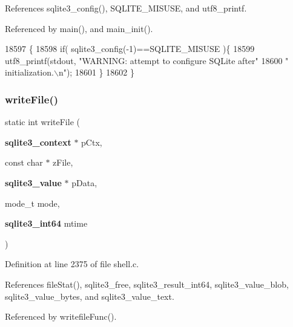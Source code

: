 References sqlite3\+\_\+config(), S\+Q\+L\+I\+T\+E\+\_\+\+M\+I\+S\+U\+SE, and utf8\+\_\+printf.



Referenced by main(), and main\+\_\+init().


\begin{DoxyCode}
18597                                       \{
18598   \textcolor{keywordflow}{if}( sqlite3_config(-1)==SQLITE_MISUSE )\{
18599     utf8_printf(stdout, \textcolor{stringliteral}{"WARNING: attempt to configure SQLite after"}
18600                         \textcolor{stringliteral}{" initialization.\(\backslash\)n"});
18601   \}
18602 \}
\end{DoxyCode}
\mbox{\label{shell_8c_a6c6e4132d386987f7993da8b744dca55}} 
\subsubsection{write\+File()}
{\footnotesize\ttfamily static int write\+File (\begin{DoxyParamCaption}\item[{\textbf{ sqlite3\+\_\+context} $\ast$}]{p\+Ctx,  }\item[{const char $\ast$}]{z\+File,  }\item[{\textbf{ sqlite3\+\_\+value} $\ast$}]{p\+Data,  }\item[{mode\+\_\+t}]{mode,  }\item[{\textbf{ sqlite3\+\_\+int64}}]{mtime }\end{DoxyParamCaption})\hspace{0.3cm}{\ttfamily [static]}}



Definition at line 2375 of file shell.\+c.



References file\+Stat(), sqlite3\+\_\+free, sqlite3\+\_\+result\+\_\+int64, sqlite3\+\_\+value\+\_\+blob, sqlite3\+\_\+value\+\_\+bytes, and sqlite3\+\_\+value\+\_\+text.



Referenced by writefile\+Func().


